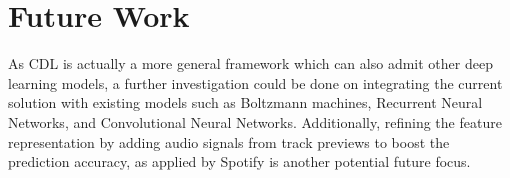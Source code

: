\documentclass{article} %
\begin{document}
\section{Future Work}

As CDL is actually a more general framework which can also admit other deep learning models, a further investigation could be done on integrating the current solution with existing models such as Boltzmann machines, Recurrent Neural Networks, and Convolutional Neural Networks. Additionally, refining the feature representation by adding audio signals from track previews to boost the prediction accuracy, as applied by Spotify \cite{van2013deep} is another potential future focus.

\clearpage
\printbibliography
\end{document}
